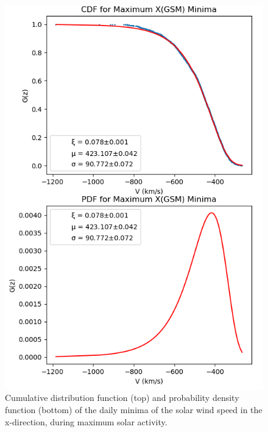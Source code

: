 \documentclass[12pt]{article}
\begin{document}
\begin{figure}[t!]
\begin{minipage}{0.48\textwidth}
                \includegraphics[width=\textwidth]{fig_method/SWEmaxXmin.png}
                \caption{Cumulative distribution function (top) and probability density function (bottom) of the daily minima of the solar wind speed in the x-direction, during maximum solar activity.}
                \label{fig:SWEmaxXmin}
            \end{minipage}
        \end{figure}
\end{document}
